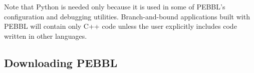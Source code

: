 Note that Python is needed only because it is used in some of PEBBL's
configuration and debugging utilities.  Branch-and-bound applications
built with PEBBL will contain only C++ code unless the user explicitly
includes code written in other languages.


\subsection{Downloading PEBBL}






